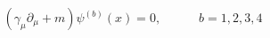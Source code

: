 \documentclass[12pt]{article}
\begin{document}
\begin{displaymath}
\left( \gamma _ { \mu } \partial _ { \mu } + m \right) \psi ^ { \left( b \right) } ( x ) = 0 , \quad \quad \quad b = 1 , 2 , 3 , 4
\end{displaymath}
\end{document}
